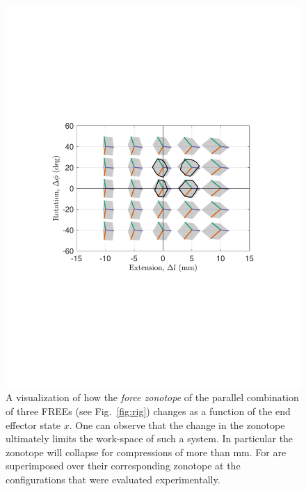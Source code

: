 \begin{figure}
    \centering
    \includegraphics[width=\linewidth]{figures/zntp_vs_x4.pdf}
    \caption{A visualization of how the \emph{force zonotope} of the parallel combination of three FREEs (see Fig.~\ref{fig:rig}) changes as a function of the end effector state $x$. One can observe that the change in the zonotope ultimately limits the work-space of such a system.  In particular the zonotope will collapse for compressions of more than \unit[-10]{mm}.  For  are superimposed over their corresponding zonotope at the configurations that were evaluated experimentally.}
    \label{fig:zntp_vs_x}
\end{figure}
